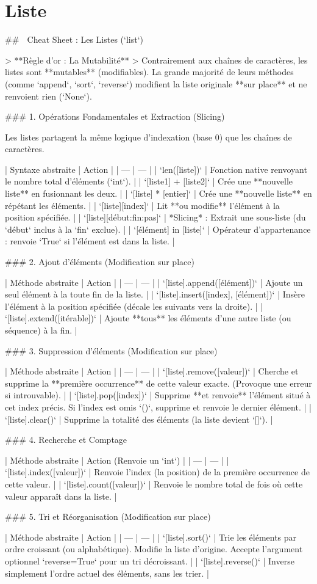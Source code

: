 \section{Liste}

## 🐍 Cheat Sheet : Les Listes (`list`)

> **Règle d'or : La Mutabilité**
> Contrairement aux chaînes de caractères, les listes sont **mutables** (modifiables). La grande majorité de leurs méthodes (comme `append`, `sort`, `reverse`) modifient la liste originale **sur place** et ne renvoient rien (`None`).

### 1. Opérations Fondamentales et Extraction (Slicing)

Les listes partagent la même logique d'indexation (base 0) que les chaînes de caractères.

| Syntaxe abstraite | Action |
| --- | --- |
| `len([liste])` | Fonction native renvoyant le nombre total d'éléments (`int`). |
| `[liste1] + [liste2]` | Crée une **nouvelle liste** en fusionnant les deux. |
| `[liste] * [entier]` | Crée une **nouvelle liste** en répétant les éléments. |
| `[liste][index]` | Lit **ou modifie** l'élément à la position spécifiée. |
| `[liste][début:fin:pas]` | *Slicing* : Extrait une sous-liste (du `début` inclus à la `fin` exclue). |
| `[élément] in [liste]` | Opérateur d'appartenance : renvoie `True` si l'élément est dans la liste. |

### 2. Ajout d'éléments (Modification sur place)

| Méthode abstraite | Action |
| --- | --- |
| `[liste].append([élément])` | Ajoute un seul élément à la toute fin de la liste. |
| `[liste].insert([index], [élément])` | Insère l'élément à la position spécifiée (décale les suivants vers la droite). |
| `[liste].extend([itérable])` | Ajoute **tous** les éléments d'une autre liste (ou séquence) à la fin. |

### 3. Suppression d'éléments (Modification sur place)

| Méthode abstraite | Action |
| --- | --- |
| `[liste].remove([valeur])` | Cherche et supprime la **première occurrence** de cette valeur exacte. (Provoque une erreur si introuvable). |
| `[liste].pop([index])` | Supprime **et renvoie** l'élément situé à cet index précis. Si l'index est omis `()`, supprime et renvoie le dernier élément. |
| `[liste].clear()` | Supprime la totalité des éléments (la liste devient `[]`). |

### 4. Recherche et Comptage

| Méthode abstraite | Action (Renvoie un `int`) |
| --- | --- |
| `[liste].index([valeur])` | Renvoie l'index (la position) de la première occurrence de cette valeur. |
| `[liste].count([valeur])` | Renvoie le nombre total de fois où cette valeur apparaît dans la liste. |

### 5. Tri et Réorganisation (Modification sur place)

| Méthode abstraite | Action |
| --- | --- |
| `[liste].sort()` | Trie les éléments par ordre croissant (ou alphabétique). Modifie la liste d'origine. Accepte l'argument optionnel `reverse=True` pour un tri décroissant. |
| `[liste].reverse()` | Inverse simplement l'ordre actuel des éléments, sans les trier. |
